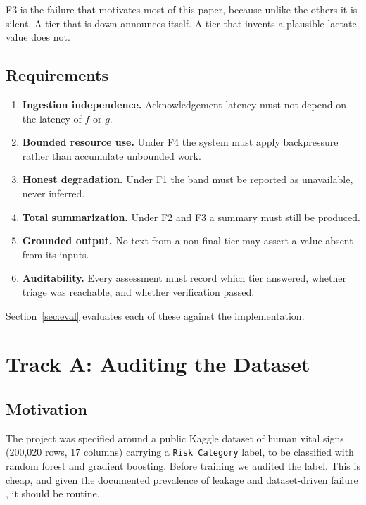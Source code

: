 \documentclass[lettersize,journal]{IEEEtran}
\begin{document}
F3 is the failure that motivates most of this paper, because unlike the others
it is silent. A tier that is down announces itself. A tier that invents a
plausible lactate value does not.

\subsection{Requirements}

\begin{enumerate}
  \item[R1] \textbf{Ingestion independence.} Acknowledgement latency must not
        depend on the latency of $f$ or $g$.
  \item[R2] \textbf{Bounded resource use.} Under F4 the system must apply
        backpressure rather than accumulate unbounded work.
  \item[R3] \textbf{Honest degradation.} Under F1 the band must be reported as
        unavailable, never inferred.
  \item[R4] \textbf{Total summarization.} Under F2 and F3 a summary must still
        be produced.
  \item[R5] \textbf{Grounded output.} No text from a non-final tier may assert a
        value absent from its inputs.
  \item[R6] \textbf{Auditability.} Every assessment must record which tier
        answered, whether triage was reachable, and whether verification passed.
\end{enumerate}

Section~\ref{sec:eval} evaluates each of these against the implementation.

\section{Track A: Auditing the Dataset}
\label{sec:tracka}

\subsection{Motivation}

The project was specified around a public Kaggle dataset of human vital
signs~\cite{dataset} (200{,}020 rows, 17 columns) carrying a
\texttt{Risk Category} label, to be classified with random forest and gradient
boosting. Before training we audited the label. This is cheap, and given the
documented prevalence of leakage \cite{kapoor2023} and dataset-driven failure
\cite{roberts2021}, it should be routine.
\end{document}
